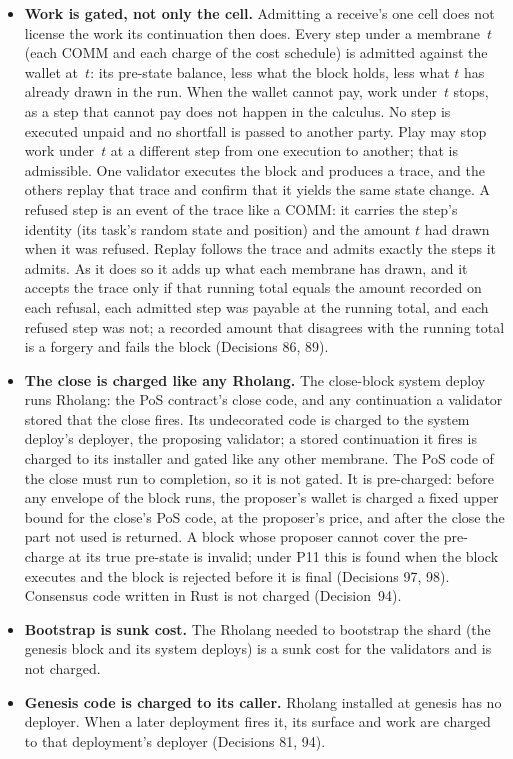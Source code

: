 \documentclass[11pt]{article}
\begin{document}
\begin{itemize}
\item \textbf{Work is gated, not only the cell.} Admitting a receive's one cell does not license the work its continuation then does. Every step under a membrane~$t$ (each COMM and each charge of the cost schedule) is admitted against the wallet at~$t$: its pre-state balance, less what the block holds, less what $t$ has already drawn in the run. When the wallet cannot pay, work under~$t$ stops, as a step that cannot pay does not happen in the calculus. No step is executed unpaid and no shortfall is passed to another party. Play may stop work under~$t$ at a different step from one execution to another; that is admissible. One validator executes the block and produces a trace, and the others replay that trace and confirm that it yields the same state change. A refused step is an event of the trace like a COMM: it carries the step's identity (its task's random state and position) and the amount $t$ had drawn when it was refused. Replay follows the trace and admits exactly the steps it admits. As it does so it adds up what each membrane has drawn, and it accepts the trace only if that running total equals the amount recorded on each refusal, each admitted step was payable at the running total, and each refused step was not; a recorded amount that disagrees with the running total is a forgery and fails the block (Decisions 86, 89).
\item \textbf{The close is charged like any Rholang.} The close-block system deploy runs Rholang: the PoS contract's close code, and any continuation a validator stored that the close fires. Its undecorated code is charged to the system deploy's deployer, the proposing validator; a stored continuation it fires is charged to its installer and gated like any other membrane. The PoS code of the close must run to completion, so it is not gated. It is pre-charged: before any envelope of the block runs, the proposer's wallet is charged a fixed upper bound for the close's PoS code, at the proposer's price, and after the close the part not used is returned. A block whose proposer cannot cover the pre-charge at its true pre-state is invalid; under P11 this is found when the block executes and the block is rejected before it is final (Decisions 97, 98). Consensus code written in Rust is not charged (Decision~94).
\item \textbf{Bootstrap is sunk cost.} The Rholang needed to bootstrap the shard (the genesis block and its system deploys) is a sunk cost for the validators and is not charged.
\item \textbf{Genesis code is charged to its caller.} Rholang installed at genesis has no deployer. When a later deployment fires it, its surface and work are charged to that deployment's deployer (Decisions 81, 94).

\end{itemize}
\end{document}
